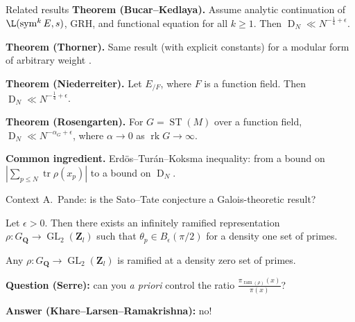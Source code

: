 \documentclass[handout]{beamer}
\DeclareMathOperator{\D}{D}
\DeclareMathOperator{\GL}{GL}
\DeclareMathOperator{\rk}{rk}
\DeclareMathOperator{\ram}{ram}
\DeclareMathOperator{\ST}{ST}
\DeclareMathOperator{\sym}{sym}
\DeclareMathOperator{\tr}{tr}
\newcommand{\bQ}{\mathbf{Q}}
\newcommand{\bZ}{\mathbf{Z}}
\begin{document}
\begin{frame}{Related results}
\textbf{Theorem (Bucar--Kedlaya).}
Assume analytic continuation of $\L(\sym^k E,s)$, GRH, and functional equation 
for all $k\geqslant 1$. Then $\D_N \ll N^{-\frac 1 4+\epsilon}$. 
\pause

\textbf{Theorem (Thorner).}
Same result (with explicit constants) for a modular form of arbitrary weight	. 
\pause

\textbf{Theorem (Niederreiter).}
Let $E_{/F}$, where $F$ is a function field. Then 
$\D_N \ll N^{-\frac 1 4+\epsilon}$. 
\pause

\textbf{Theorem (Rosengarten).}
For $G = \ST(M)$ over a function field, 
$\D_N \ll N^{-\alpha_G+\epsilon}$, where $\alpha\to 0$ as $\rk G\to \infty$. 
\pause

\textbf{Common ingredient.}
Erd\"os--Tur\'an--Koksma inequality: from a bound on
$\left|\sum_{p\leqslant N} \tr \rho(x_p)\right|$ to a bound on $\D_N$.
\end{frame}


\begin{frame}{Context}
A.~Pande: is the Sato--Tate conjecture a Galois-theoretic result?
\pause

\begin{theorem}[Pande]
Let $\epsilon>0$. Then there exists an infinitely ramified representation 
$\rho\colon G_\bQ \to \GL_2(\bZ_l)$ such that $\theta_p\in B_\epsilon(\pi/2)$ 
for a density one set of primes. 
\end{theorem}
\pause

\begin{theorem}
Any $\rho\colon G_\bQ \to \GL_2(\bZ_l)$ is ramified at a density zero set of 
primes. 
\end{theorem}
\pause

\textbf{Question (Serre):} can you \emph{a priori} control the ratio 
$\frac{\pi_{\ram(\rho)}(x)}{\pi(x)}$?
\pause

\textbf{Answer (Khare--Larsen--Ramakrishna):} no!
\end{frame}
\end{document}
